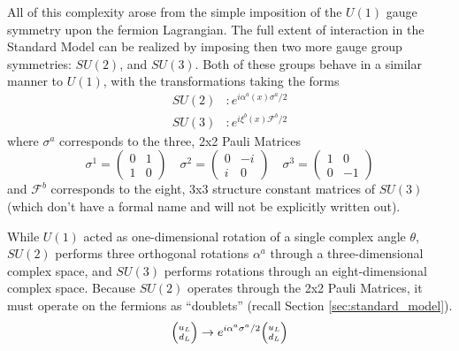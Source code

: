     All of this complexity arose from the simple imposition of the $U(1)$ gauge symmetry upon the fermion Lagrangian.
    The full extent of interaction in the Standard Model can be realized by imposing then two more gauge group symmetries:
        $SU(2)$, and $SU(3)$.
    Both of these groups behave in a similar manner to $U(1)$, with the transformations taking the forms
    \begin{equation} \begin{split}
        SU(2)&: e^{i \alpha^a(x) \sigma^a / 2}
        \\SU(3)&: e^{i \xi^b(x) \mathscr{F}^b / 2}
    \end{split} \end{equation}
    where $\sigma^a$ corresponds to the three, 2x2 Pauli Matrices
    \begin{equation}
        \sigma^1 = \begin{pmatrix} 0 & 1 \\ 1 & 0 \end{pmatrix} \quad
        \sigma^2 = \begin{pmatrix} 0 & -i \\ i & 0 \end{pmatrix} \quad
        \sigma^3 = \begin{pmatrix} 1 & 0 \\ 0 & -1 \end{pmatrix}
    \end{equation}
    and $\mathscr{F}^b$ corresponds to the eight, 3x3 structure constant matrices of $SU(3)$
        (which don't have a formal name and will not be explicitly written out).

    While $U(1)$ acted as one-dimensional rotation of a single complex angle $\theta$,
        $SU(2)$ performs three orthogonal rotations $\alpha^a$ through a three-dimensional complex space,
        and $SU(3)$ performs rotations through an eight-dimensional complex space.
    Because $SU(2)$ operates through the 2x2 Pauli Matrices, it must operate on the fermions as ``doublets''
        (recall Section \ref{sec:standard_model}).
    \begin{equation}
        \minimatrix{u_L \\ d_L} \to e^{i \alpha^a \sigma^a / 2} \minimatrix{u_L \\ d_L}
    \end{equation}

